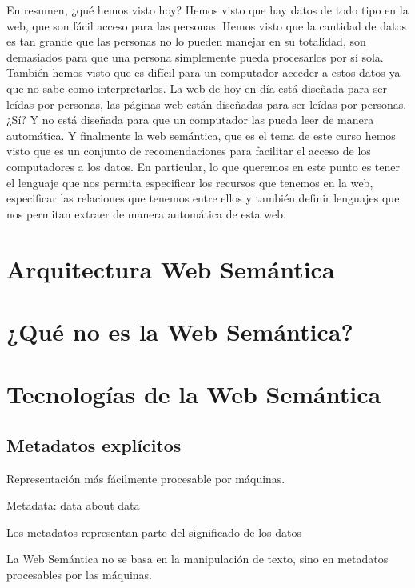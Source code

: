 En resumen, ¿qué hemos visto hoy? Hemos visto que hay datos de todo tipo en la web, que son fácil acceso para las personas. Hemos visto que la cantidad de datos es tan grande que las personas no lo pueden manejar en su totalidad, son demasiados para que una persona simplemente pueda procesarlos por sí sola. También hemos visto que es difícil para un computador acceder a estos datos ya que no sabe como interpretarlos. La web de hoy en día está diseñada para ser leídas por personas, las páginas web están diseñadas para ser leídas por personas. ¿Sí? Y no está diseñada para que un computador las pueda leer de manera automática. Y finalmente la web semántica, que es el tema de este curso hemos visto que es un conjunto de recomendaciones para facilitar el acceso de los computadores a los datos. En particular, lo que queremos en este punto es tener el lenguaje que nos permita especificar los recursos que tenemos en la web, especificar las relaciones que tenemos entre ellos y también definir lenguajes que nos permitan extraer de manera automática de esta web.

\section{Arquitectura Web Semántica}



\section{¿Qué no es la Web Semántica?}


\section{Tecnologías de la Web Semántica}

\subsection{Metadatos explícitos}

Representación más fácilmente procesable por máquinas.

Metadata: data about data

Los metadatos representan parte del significado de los datos

La Web Semántica no se basa en la manipulación de texto, sino en metadatos procesables por las máquinas.

